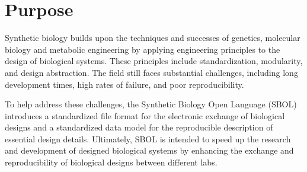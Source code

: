\section{Purpose}



Synthetic biology builds upon the techniques and successes of genetics, molecular biology and metabolic engineering by applying engineering principles to the design of biological systems. These principles include standardization, modularity, and design abstraction. The field still faces substantial challenges, including long development times, high rates of failure, and poor reproducibility.

To help address these challenges, the Synthetic Biology Open Language (SBOL) introduces  a standardized file format for the electronic exchange of biological designs and a standardized data model for the reproducible description of essential design details. Ultimately, SBOL is intended to speed up the research and development of designed biological systems by enhancing the exchange and reproducibility of biological designs between different labs.   




